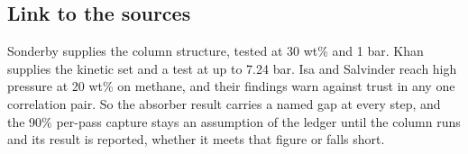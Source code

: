 \subsection*{Link to the sources}
Sonderby supplies the column structure, tested at 30 wt\% and 1 bar. Khan supplies the kinetic set and a test at up to 7.24 bar. Isa and Salvinder reach high pressure at 20 wt\% on methane, and their findings warn against trust in any one correlation pair. So the absorber result carries a named gap at every step, and the 90\% per-pass capture stays an assumption of the ledger until the column runs and its result is reported, whether it meets that figure or falls short.
